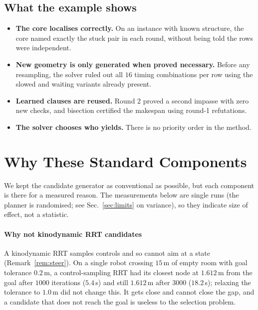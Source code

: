 \documentclass[conference]{IEEEtran}
\theoremstyle{plain}
\theoremstyle{definition}
\begin{document}
\subsection{What the example shows}

\begin{itemize}
  \item \textbf{The core localises correctly.} On an instance with known structure, the core
        named exactly the stuck pair in each round, without being told the rows were
        independent.
  \item \textbf{New geometry is only generated when proved necessary.} Before any resampling,
        the solver ruled out all $16$ timing combinations per row using the slowed and waiting
        variants already present.
  \item \textbf{Learned clauses are reused.} Round 2 proved a second impasse with zero new
        checks, and bisection certified the makespan using round-1 refutations.
  \item \textbf{The solver chooses who yields.} There is no priority order in the method.
\end{itemize}

\section{Why These Standard Components}
\label{sec:design}

We kept the candidate generator as conventional as possible, but each component is there for
a measured reason. The measurements below are single runs (the planner is randomised; see
Sec.~\ref{sec:limits} on variance), so they indicate size of effect, not a statistic.

\paragraph*{Why not kinodynamic RRT candidates}
A kinodynamic RRT samples controls and so cannot aim at a state (Remark~\ref{rem:steer}). On a
single robot crossing $15$\,m of empty room with goal tolerance $0.2$\,m, a control-sampling
RRT had its closest node at $1.612$\,m from the goal after $1000$ iterations ($5.4$\,s) and
still $1.612$\,m after $3000$ ($18.2$\,s); relaxing the tolerance to $1.0$\,m did not change
this. It gets close and cannot close the gap, and a candidate that does not reach the goal is
useless to the selection problem.
\end{document}
